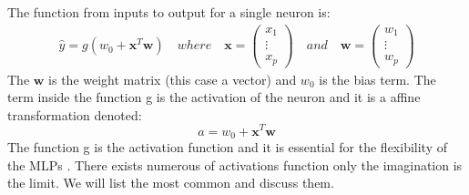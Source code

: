 The function from inputs to output for a single neuron is:
\begin{align}   
\hat{y}=g(w_0 + \bm{x}^T \bm{w}) \quad where \quad \bm{x}=\begin{pmatrix}
x_1 \\
\vdots\\
x_p
\end{pmatrix} \quad and \quad \bm{w}=\begin{pmatrix}
w_1 \\
\vdots \\
w_p
\end{pmatrix}
\end{align}
The $\bm{w}$ is the weight matrix (this case a vector) and $w_0$ is the bias term. The term inside the function g is the activation of the neuron and it is a affine transformation denoted:
$$a= w_0 + \bm{x}^T \bm{w}$$
The function g is the activation function and it is essential for the flexibility of the MLPs \parencite{Mackay18}. There exists numerous of activations function only the imagination is the limit. We will list the most common and discuss them.


